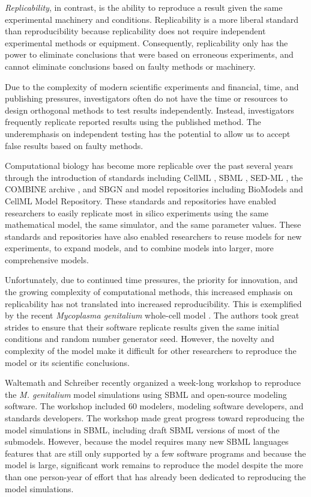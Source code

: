 \documentclass[journal,transmag,twoside]{IEEEtran}
\begin{document}
\textit{Replicability}, in contrast, is the ability to reproduce a result given the same experimental machinery and conditions. 
Replicability is a more liberal standard than reproducibility because replicability does not require independent experimental methods or equipment.
Consequently, replicability only has the power to eliminate conclusions that were based on erroneous experiments, and cannot eliminate conclusions based on faulty methods or machinery.

Due to the complexity of modern scientific experiments and financial, time, and publishing pressures, investigators often do not have the time or resources to design orthogonal methods to test results independently. Instead, investigators frequently replicate reported results using the published method. The underemphasis on independent testing has the potential to allow us to accept false results based on faulty methods.

Computational biology has become more replicable over the past several years through the introduction of standards including CellML \cite{cuellar2003overview}, SBML \cite{hucka2003}, SED-ML \cite{sedml2011}, the COMBINE archive \cite{COMBINE2012}, and SBGN \cite{LeNovereHMMSS09} and model repositories including BioModels and CellML Model Repository. These standards and repositories have enabled researchers to easily replicate most in silico experiments using the same mathematical model, the same simulator, and the same parameter values. These standards and repositories have also enabled researchers to reuse models for new experiments, to expand models, and to combine models into larger, more comprehensive models.

Unfortunately, due to continued time pressures, the priority for innovation, and the growing complexity of computational methods, this increased emphasis on replicability has not translated into increased reproducibility. This is exemplified by the recent \textit{Mycoplasma genitalium} whole-cell model \cite{Karr2012}. The authors took great strides to ensure that their software replicate results given the same initial conditions and random number generator seed. However, the novelty and complexity of the model make it difficult for other researchers to reproduce the model or its scientific conclusions. 

Waltemath and Schreiber recently organized a week-long workshop to reproduce the \textit{M. genitalium} model simulations using SBML and open-source modeling software. The workshop included 60 modelers, modeling software developers, and standards developers. The workshop made great progress toward reproducing the model simulations in SBML, including draft SBML versions of most of the submodels. However, because the model requires many new SBML languages features that are still only supported by a few software programs and because the model is large, significant work remains to reproduce the model despite the more than one person-year of effort that has already been dedicated to reproducing the model simulations.
\end{document}
